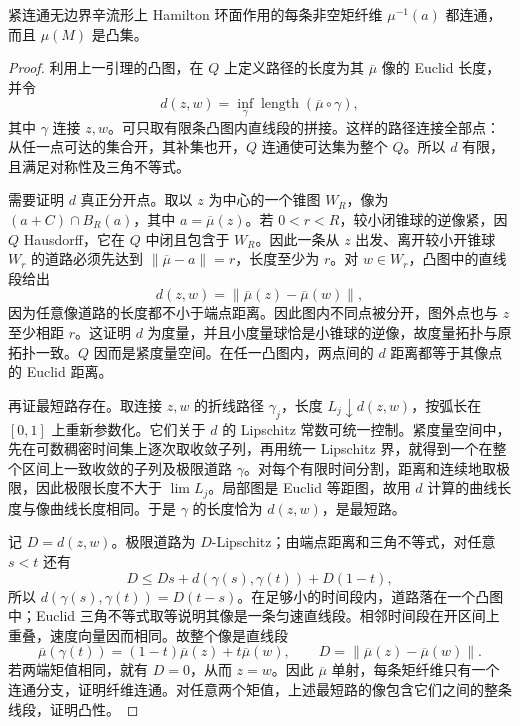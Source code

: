 \begin{theorem}\label{g4:thm:1202:connected-fibres}
	紧连通无边界辛流形上 Hamilton 环面作用的每条非空矩纤维 \(\mu^{-1}(a)\) 都连通，而且 \(\mu(M)\) 是凸集。
\end{theorem}
\begin{proof}
	利用上一引理的凸图，在 \(Q\) 上定义路径的长度为其 \(\overline\mu\) 像的 Euclid 长度，并令
	\[
		d(z,w)=\inf_\gamma\operatorname{length}(\overline\mu\circ\gamma),
	\]
	其中 \(\gamma\) 连接 \(z,w\)。可只取有限条凸图内直线段的拼接。这样的路径连接全部点：从任一点可达的集合开，其补集也开，\(Q\) 连通使可达集为整个 \(Q\)。所以 \(d\) 有限，且满足对称性及三角不等式。

	需要证明 \(d\) 真正分开点。取以 \(z\) 为中心的一个锥图 \(W_R\)，像为 \((a+C)\cap B_R(a)\)，其中 \(a=\overline\mu(z)\)。若 \(0<r<R\)，较小闭锥球的逆像紧，因 \(Q\) Hausdorff，它在 \(Q\) 中闭且包含于 \(W_R\)。因此一条从 \(z\) 出发、离开较小开锥球 \(W_r\) 的道路必须先达到 \(\|\overline\mu-a\|=r\)，长度至少为 \(r\)。对 \(w\in W_r\)，凸图中的直线段给出
	\[
		d(z,w)=\|\overline\mu(z)-\overline\mu(w)\|,
	\]
	因为任意像道路的长度都不小于端点距离。因此图内不同点被分开，图外点也与 \(z\) 至少相距 \(r\)。这证明 \(d\) 为度量，并且小度量球恰是小锥球的逆像，故度量拓扑与原拓扑一致。\(Q\) 因而是紧度量空间。在任一凸图内，两点间的 \(d\) 距离都等于其像点的 Euclid 距离。

	再证最短路存在。取连接 \(z,w\) 的折线路径 \(\gamma_j\)，长度 \(L_j\downarrow d(z,w)\)，按弧长在 \([0,1]\) 上重新参数化。它们关于 \(d\) 的 Lipschitz 常数可统一控制。紧度量空间中，先在可数稠密时间集上逐次取收敛子列，再用统一 Lipschitz 界，就得到一个在整个区间上一致收敛的子列及极限道路 \(\gamma\)。对每个有限时间分割，距离和连续地取极限，因此极限长度不大于 \(\lim L_j\)。局部图是 Euclid 等距图，故用 \(d\) 计算的曲线长度与像曲线长度相同。于是 \(\gamma\) 的长度恰为 \(d(z,w)\)，是最短路。

	记 \(D=d(z,w)\)。极限道路为 \(D\)-Lipschitz；由端点距离和三角不等式，对任意 \(s<t\) 还有
	\[
		D\leq Ds+d(\gamma(s),\gamma(t))+D(1-t),
	\]
	所以 \(d(\gamma(s),\gamma(t))=D(t-s)\)。在足够小的时间段内，道路落在一个凸图中；Euclid 三角不等式取等说明其像是一条匀速直线段。相邻时间段在开区间上重叠，速度向量因而相同。故整个像是直线段
	\[
		\overline\mu(\gamma(t))
		=(1-t)\overline\mu(z)+t\overline\mu(w),
		\qquad
		D=\|\overline\mu(z)-\overline\mu(w)\|.
	\]
	若两端矩值相同，就有 \(D=0\)，从而 \(z=w\)。因此 \(\overline\mu\) 单射，每条矩纤维只有一个连通分支，证明纤维连通。对任意两个矩值，上述最短路的像包含它们之间的整条线段，证明凸性。
\end{proof}

